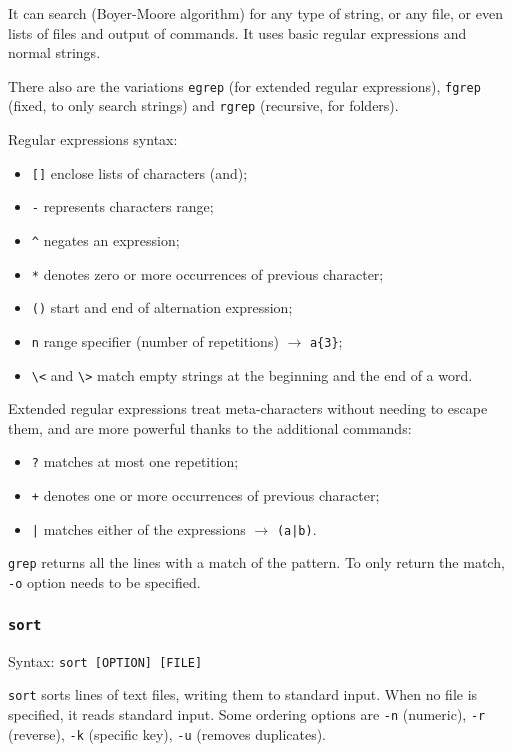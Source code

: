 It can search (Boyer-Moore algorithm) for any type of string, or any file, or even lists of files and output of commands. It uses basic regular expressions and normal strings.

There also are the variations \texttt{egrep} (for extended regular expressions), \texttt{fgrep} (fixed, to only search strings) and \texttt{rgrep} (recursive, for folders).

Regular expressions syntax:
\begin{itemize}
	\item \texttt{[]} enclose lists of characters (and);
	\item \texttt{-} represents characters range;
	\item \texttt{\^} negates an expression;
	\item \texttt{*} denotes zero or more occurrences of previous character;
	\item \texttt{()} start and end of alternation expression;
	\item \texttt{{n}} range specifier (number of repetitions) $\rightarrow$ \texttt{a\{3\}};
	\item \texttt{\textbackslash<} and \texttt{\textbackslash>} match empty strings at the beginning and the end of a word.
\end{itemize}

Extended regular expressions treat meta-characters without needing to escape them, and are more powerful thanks to the additional commands:
\begin{itemize}
	\item \texttt{?} matches at most one repetition;
	\item \texttt{+} denotes one or more occurrences of previous character;
	\item \texttt{|} matches either of the expressions $\rightarrow$ \texttt{(a|b)}.
\end{itemize}

\texttt{grep} returns all the lines with a match of the pattern. To only return the match, \texttt{-o} option needs to be specified.

\subsubsection{\texttt{sort}}
Syntax: \texttt{sort [OPTION] [FILE]}

\texttt{sort} sorts lines of text files, writing them to standard input. When no file is specified, it reads standard input. Some ordering options are \texttt{-n} (numeric), \texttt{-r} (reverse), \texttt{-k} (specific key), \texttt{-u} (removes duplicates).

